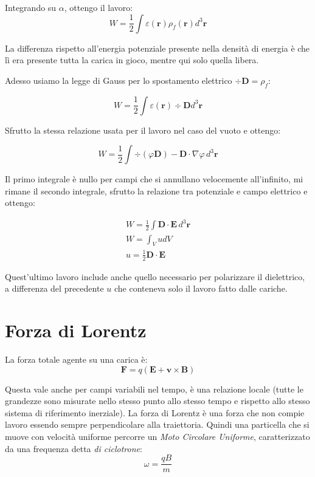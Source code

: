 \documentclass[a4paper]{scrarticle}
\begin{document}
Integrando su $\alpha$, ottengo il lavoro:
\begin{equation}
    W = \frac{1}{2} \int \varepsilon(\bm r) \rho_f(\bm r) d^3 \bm r
\end{equation}

La differenza rispetto all'energia potenziale presente nella densità di energia è che lì era presente tutta la carica in gioco, mentre qui solo quella libera.

Adesso usiamo la legge di Gauss per lo spostamento elettrico $\div \bm D = \rho_f$:

\begin{equation*}
    W = \frac{1}{2} \int \varepsilon(\bm r) \div \bm D d^3 \bm r
\end{equation*}

Sfrutto la stessa relazione usata per il lavoro nel caso del vuoto e ottengo:

\begin{equation*}
    W = \frac{1}{2}\int \div (\varphi \bm D) - \bm D \cdot \nabla \varphi \, d^3\bm r
\end{equation*}

Il primo integrale è nullo per campi che si annullano velocemente all'infinito, mi rimane il secondo integrale, sfrutto la relazione tra potenziale e campo elettrico e ottengo:

\begin{gather}
    W = \frac{1}{2} \int \bm D \cdot \bm E \, d^3\bm r\\
    W = \int_V u dV\\
    u = \frac{1}{2} \bm D \cdot \bm E
\end{gather}

Quest'ultimo lavoro include anche quello necessario per polarizzare il dielettrico, a differenza del precedente $u$ che conteneva solo il lavoro fatto dalle cariche.

\section{Forza di Lorentz}

La forza totale agente su una carica è:
\begin{equation}
    \bm F = q \left(\bm E + \bm v \times \bm B\right)
\end{equation}

Questa vale anche per campi variabili nel tempo, è una relazione locale (tutte le grandezze sono misurate nello stesso punto allo stesso tempo e rispetto allo stesso sistema di riferimento inerziale).
La forza di Lorentz è una forza che non compie lavoro essendo sempre perpendicolare alla traiettoria.
Quindi una particella che si muove con velocità uniforme percorre un \emph{Moto Circolare Uniforme}, caratterizzato da una frequenza detta \emph{di ciclotrone}:
\begin{equation}
    \omega = \frac{qB}{m}
\end{equation}
\end{document}
